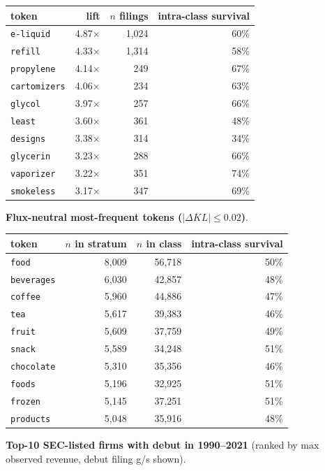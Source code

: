 \begin{tabular}{lrrr}
\toprule
token & lift & $n$ filings & intra-class survival \\
\midrule
\texttt{e-liquid} & 4.87$\times$ & 1,024 & 60\% \\
\texttt{refill} & 4.33$\times$ & 1,314 & 58\% \\
\texttt{propylene} & 4.14$\times$ & 249 & 67\% \\
\texttt{cartomizers} & 4.06$\times$ & 234 & 63\% \\
\texttt{glycol} & 3.97$\times$ & 257 & 66\% \\
\texttt{least} & 3.60$\times$ & 361 & 48\% \\
\texttt{designs} & 3.38$\times$ & 314 & 34\% \\
\texttt{glycerin} & 3.23$\times$ & 288 & 66\% \\
\texttt{vaporizer} & 3.22$\times$ & 351 & 74\% \\
\texttt{smokeless} & 3.17$\times$ & 347 & 69\% \\
\bottomrule
\end{tabular}

\textbf{Flux-neutral most-frequent tokens ($|\Delta KL|\leq 0.02$)}.

\begin{tabular}{lrrr}
\toprule
token & $n$ in stratum & $n$ in class & intra-class survival \\
\midrule
\texttt{food} & 8,009 & 56,718 & 50\% \\
\texttt{beverages} & 6,030 & 42,857 & 48\% \\
\texttt{coffee} & 5,960 & 44,886 & 47\% \\
\texttt{tea} & 5,617 & 39,383 & 46\% \\
\texttt{fruit} & 5,609 & 37,759 & 49\% \\
\texttt{snack} & 5,589 & 34,248 & 51\% \\
\texttt{chocolate} & 5,310 & 35,356 & 46\% \\
\texttt{foods} & 5,196 & 32,925 & 51\% \\
\texttt{frozen} & 5,145 & 37,251 & 51\% \\
\texttt{products} & 5,048 & 35,916 & 48\% \\
\bottomrule
\end{tabular}

\textbf{Top-10 SEC-listed firms with debut in 1990--2021} (ranked by max observed revenue, debut filing g/s shown).


